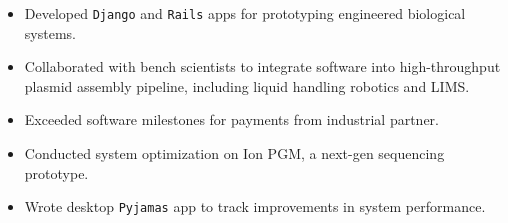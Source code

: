 \documentclass[margin]{res}
\begin{document}
\begin{sloppypar}
\begin{resume}
\begin{itemize}
\item Developed \texttt{Django} and \texttt{Rails} apps for prototyping engineered biological systems.
\item Collaborated with bench scientists to integrate software into high-throughput plasmid assembly pipeline, including liquid handling robotics and LIMS.
\item Exceeded software milestones for payments from industrial partner.
\end{itemize}
\begin{itemize}
\item Conducted system optimization on Ion PGM, a next-gen sequencing prototype.
\item Wrote desktop \texttt{Pyjamas} app to track improvements in system performance.
\end{itemize}


\end{resume}
\end{sloppypar}
\end{document}
